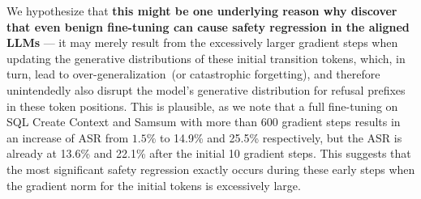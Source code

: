 We hypothesize that \textbf{this might be one underlying reason why \citet{qi2023fine} discover that even benign fine-tuning can cause safety regression in the aligned LLMs} --- it may merely result from the excessively larger gradient steps when updating the generative distributions of these initial transition tokens, which, in turn, lead to over-generalization~(or catastrophic forgetting), and therefore unintendedly also disrupt the model's generative distribution for refusal prefixes in these token positions. This is plausible, as we note that a full fine-tuning on SQL Create Context and Samsum with more than 600 gradient steps results in an increase of ASR from $1.5\%$ to 14.9\% and 25.5\% respectively, but the ASR is already at 13.6\% and 22.1\% after the initial 10 gradient steps. This suggests that the most significant safety regression exactly occurs during these early steps when the gradient norm for the initial tokens is excessively large.
 
